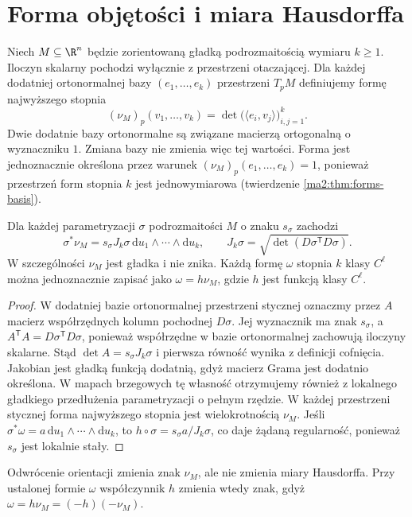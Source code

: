 \section{Forma objętości i miara Hausdorffa}

Niech $M\subseteq\R^n$ będzie zorientowaną gładką
podrozmaitością wymiaru $k\ge1$.
Iloczyn skalarny pochodzi wyłącznie z przestrzeni
otaczającej. Dla każdej dodatniej ortonormalnej
bazy $(e_1,\ldots,e_k)$ przestrzeni $T_pM$
definiujemy formę najwyższego stopnia
\[
 (\nu_M)_p(v_1,\ldots,v_k)
 =\det\bigl(\langle e_i,v_j\rangle\bigr)_{i,j=1}^k.
\]
Dwie dodatnie bazy ortonormalne są związane
macierzą ortogonalną o wyznaczniku $1$.
Zmiana bazy nie zmienia więc tej wartości.
Forma jest jednoznacznie określona przez
warunek $(\nu_M)_p(e_1,\ldots,e_k)=1$,
ponieważ przestrzeń form stopnia $k$ jest
jednowymiarowa (twierdzenie \ref{ma2:thm:forms-basis}).

\begin{twierdzenie}
\label{ma2:thm:induced-volume-form}
Dla każdej parametryzacji $\sigma$
podrozmaitości $M$ o znaku $s_\sigma$ zachodzi
\[
 \sigma^*\nu_M=s_\sigma J_k\sigma\,
 \mathrm du_1\wedge\cdots\wedge\mathrm du_k,
 \qquad
 J_k\sigma=\sqrt{\det(D\sigma^{\mathsf T}D\sigma)}.
\]
W szczególności $\nu_M$ jest gładka i nie znika.
Każdą formę $\omega$ stopnia $k$ klasy $C^\ell$
można jednoznacznie zapisać jako
$\omega=h\nu_M$, gdzie $h$ jest funkcją klasy $C^\ell$.
\end{twierdzenie}
\begin{proof}
W dodatniej bazie ortonormalnej przestrzeni
stycznej oznaczmy przez $A$ macierz współrzędnych
kolumn pochodnej $D\sigma$. Jej wyznacznik ma
znak $s_\sigma$, a $A^{\mathsf T}A=D\sigma^{\mathsf T}D\sigma$,
ponieważ współrzędne w bazie ortonormalnej
zachowują iloczyny skalarne.
Stąd $\det A=s_\sigma J_k\sigma$ i pierwsza równość
wynika z definicji cofnięcia.
Jakobian jest gładką funkcją dodatnią,
gdyż macierz Grama jest dodatnio określona.
W mapach brzegowych tę własność otrzymujemy
również z lokalnego gładkiego przedłużenia
parametryzacji o pełnym rzędzie.
W każdej przestrzeni stycznej forma najwyższego
stopnia jest wielokrotnością $\nu_M$.
Jeśli $\sigma^*\omega=a\,\mathrm du_1\wedge
\cdots\wedge\mathrm du_k$, to
$h\circ\sigma=s_\sigma a/J_k\sigma$, co daje żądaną
regularność, ponieważ $s_\sigma$ jest lokalnie stały.
\end{proof}

Odwrócenie orientacji zmienia znak $\nu_M$,
ale nie zmienia miary Hausdorffa. Przy ustalonej
formie $\omega$ współczynnik $h$ zmienia wtedy
znak, gdyż $\omega=h\nu_M=(-h)(-\nu_M)$.

